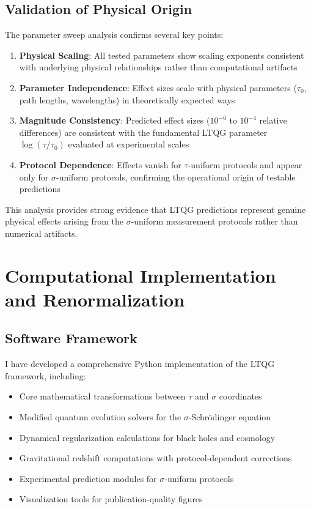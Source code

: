 \documentclass[12pt,a4paper]{article}
\begin{document}
\subsection{Validation of Physical Origin}

The parameter sweep analysis confirms several key points:

\begin{enumerate}
\item \textbf{Physical Scaling}: All tested parameters show scaling exponents consistent with underlying physical relationships rather than computational artifacts

\item \textbf{Parameter Independence}: Effect sizes scale with physical parameters ($\tau_0$, path lengths, wavelengths) in theoretically expected ways

\item \textbf{Magnitude Consistency}: Predicted effect sizes ($10^{-6}$ to $10^{-4}$ relative differences) are consistent with the fundamental LTQG parameter $\log(\tau/\tau_0)$ evaluated at experimental scales

\item \textbf{Protocol Dependence}: Effects vanish for $\tau$-uniform protocols and appear only for $\sigma$-uniform protocols, confirming the operational origin of testable predictions
\end{enumerate}

This analysis provides strong evidence that LTQG predictions represent genuine physical effects arising from the $\sigma$-uniform measurement protocols rather than numerical artifacts.

\section{Computational Implementation and Renormalization}

\subsection{Software Framework}

I have developed a comprehensive Python implementation of the LTQG framework, including:

\begin{itemize}
\item Core mathematical transformations between $\tau$ and $\sigma$ coordinates
\item Modified quantum evolution solvers for the $\sigma$-Schrödinger equation
\item Dynamical regularization calculations for black holes and cosmology
\item Gravitational redshift computations with protocol-dependent corrections
\item Experimental prediction modules for $\sigma$-uniform protocols
\item Visualization tools for publication-quality figures
\end{itemize}
\end{document}

